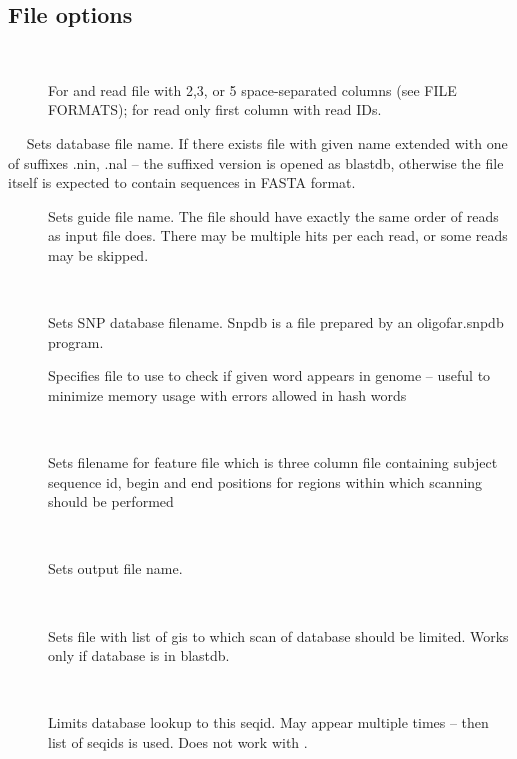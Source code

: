\documentclass[english]{article}
\begin{document}
\subsection{File options}

\begin{description}
\item[~~]
    			For  and  read file with 2,3, 
				or 5 space-separated 
                columns (see FILE FORMATS); for  read only first column 
                with read IDs.
\item[~~
				Sets database file name. If there exists file with given name
                extended with one of suffixes .nin, .nal -- the suffixed version 
                is opened as blastdb, otherwise the file itself is expected to
                contain sequences in FASTA format. 
\item[\OptArg{--guide-file}{=filename}~~\OptArg{-g}{~filename}]
				Sets guide file name. The file should have exactly the same order 
                of reads as input file does. There may be multiple hits per each
                read, or some reads may be skipped.
\item[~~] 
				Sets SNP database filename. Snpdb is a file prepared by an
                oligofar.snpdb program.
\item[]
				Specifies file to use to check if given word appears in genome -- useful
				to minimize memory usage with errors allowed in hash words
\item[~~] 
				Sets filename for feature file which is three column file
                containing subject sequence id, begin and end positions for
                regions within which scanning should be performed
\item[~~]
				Sets output file name.
\item[~~]
				Sets file with list of gis to which scan of database should be
                limited. Works only if database is in blastdb.
\item[~~]
				Limits database lookup to this seqid. May appear multiple
                times -- then list of seqids is used. Does not work with .

\end{description}
\end{document}
